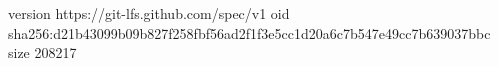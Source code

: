 version https://git-lfs.github.com/spec/v1
oid sha256:d21b43099b09b827f258fbf56ad2f1f3e5cc1d20a6c7b547e49cc7b639037bbc
size 208217
